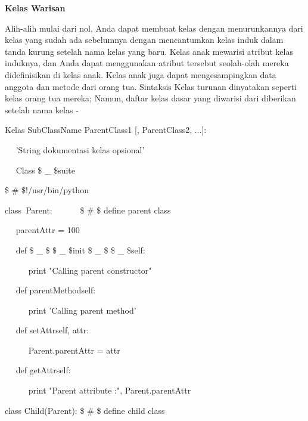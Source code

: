 \begin{12pt}
\begin{12pt}
\begin{12pt}
\begin{12pt}
\begin{12pt}
\begin{12pt}
\begin{12pt}
\begin{12pt}
\begin{12pt}
\begin{12pt}
\begin{12pt}
\begin{12pt}
\begin{12pt}
\begin{12pt}
\begin{12pt}
\begin{12pt}
\vspace{12pt}
\vspace{12pt}
\noindent 
{\fontsize{14pt}{14pt}\selectfont \textbf{Kelas Warisan} \\} \par
\begin{12pt}
Alih-alih mulai dari nol, Anda dapat membuat kelas dengan menurunkannya dari kelas yang sudah ada sebelumnya dengan mencantumkan kelas induk dalam tanda kurung setelah nama kelas yang baru. Kelas anak mewarisi atribut kelas induknya, dan Anda dapat menggunakan atribut tersebut seolah-olah mereka didefinisikan di kelas anak. Kelas anak juga dapat mengesampingkan data anggota dan metode dari orang tua. Sintaksis Kelas turunan dinyatakan seperti kelas orang tua mereka; Namun, daftar kelas dasar yang diwarisi dari diberikan setelah nama kelas - \par
\vspace{12pt}
\noindent 
Kelas SubClassName {ParentClass1 [, ParentClass2, ...]}: \par
\noindent 
~~ 'String dokumentasi kelas opsional' \par
\noindent 
~~ Class \$  \_  \$suite \par
\noindent 
 \$  \#  \$!/usr/bin/python \par
\vspace{12pt}
\noindent 
class~Parent:~~~~~~   \$  \#  \$ define parent class \par
\noindent 
~~ parentAttr = 100 \par
\noindent 
~~ def  \$  \_  \$ \$  \_  \$init \$  \_  \$ \$  \_  \${self}: \par
\noindent 
~~~~~ print "Calling parent constructor" \par
\vspace{12pt}
\noindent 
~~ def parentMethod{self}: \par
\noindent 
~~~~~ print 'Calling parent method' \par
\begin{12pt}
\noindent 
~~ def setAttr{self, attr}: \par
\noindent 
~~~~~ Parent.parentAttr = attr \par
\begin{12pt}
\noindent 
~~ def getAttr{self}: \par
\noindent 
~~~~~ print "Parent attribute :", Parent.parentAttr \par
\vspace{12pt}
\noindent 
class Child(Parent):  \$  \#  \$ define child class \par

\end{12pt}
\end{12pt}
\end{12pt}
\end{12pt}
\end{12pt}
\end{12pt}
\end{12pt}
\end{12pt}
\end{12pt}
\end{12pt}
\end{12pt}
\end{12pt}
\end{12pt}
\end{12pt}
\end{12pt}
\end{12pt}
\end{12pt}
\end{12pt}
\end{12pt}
